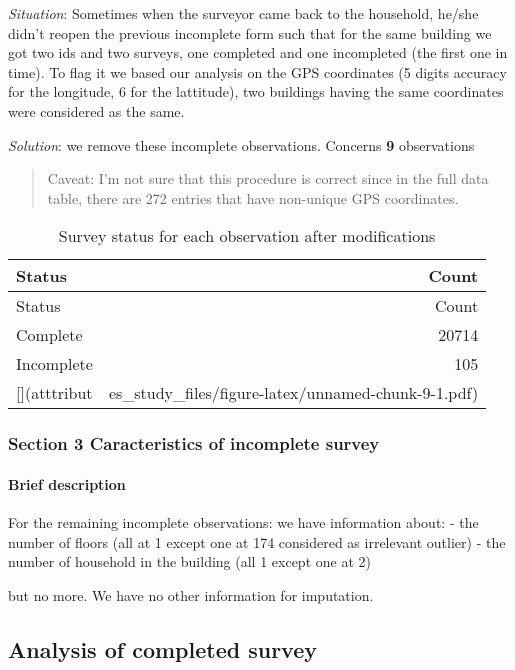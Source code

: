 \documentclass[]{article}
\let\oldparagraph\paragraph
\renewcommand{\paragraph}[1]{\oldparagraph{#1}\mbox{}}
\begin{document}
\emph{Situation}: Sometimes when the surveyor came back to the
household, he/she didn't reopen the previous incomplete form such that
for the same building we got two ids and two surveys, one completed and
one incompleted (the first one in time). To flag it we based our
analysis on the GPS coordinates (5 digits accuracy for the longitude, 6
for the lattitude), two buildings having the same coordinates were
considered as the same.

\emph{Solution}: we remove these incomplete observations. Concerns
\textbf{9} observations

\begin{quote}
Caveat: I'm not sure that this procedure is correct since in the full
data table, there are 272 entries that have non-unique GPS coordinates.
\end{quote}

\begin{longtable}[]{@{}lr@{}}
\caption{Survey status for each observation after
modifications}\tabularnewline
\toprule
Status & Count\tabularnewline
\midrule
\endfirsthead
\toprule
Status & Count\tabularnewline
\midrule
\endhead
Complete & 20714\tabularnewline
Incomplete & 105\tabularnewline
{[}{]}(atttribut &
es\_study\_files/figure-latex/unnamed-chunk-9-1.pdf)\tabularnewline
\bottomrule
\end{longtable}

\subsubsection{Section 3 Caracteristics of incomplete
survey}\label{section-3-caracteristics-of-incomplete-survey}

\paragraph{Brief description}\label{brief-description}

For the remaining incomplete observations: we have information about: -
the number of floors (all at 1 except one at 174 considered as
irrelevant outlier) - the number of household in the building (all 1
except one at 2)

but no more. We have no other information for imputation.

\subsection{Analysis of completed
survey}\label{analysis-of-completed-survey}
\end{document}
